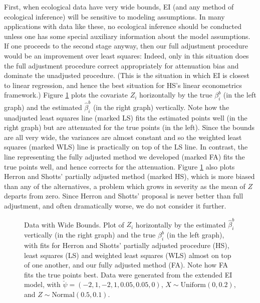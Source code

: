 \documentclass[11pt,titlepage]{article}
\begin{document}
First, when ecological data have very wide bounds, EI (and any method
of ecological inference) will be sensitive to modeling assumptions.
In many applications with data like these, no ecological inference
should be conducted unless one has some special auxiliary information
about the model assumptions.  If one proceeds to the second stage
anyway, then our full adjustment procedure would be an improvement
over least squares: Indeed, only in this situation does the full
adjustment procedure correct appropriately for attenuation bias and
dominate the unadjusted procedure.  (This is the situation in which EI
is closest to linear regression, and hence the best situation for HS's
linear econometrics framework.)  Figure \ref{f:wide} plots the
covariate $Z_i$ horizontally by the true $\beta_i^b$ (in the left
graph) and the estimated $\hat\beta_i^b$ (in the right graph)
vertically.  Note how the unadjusted least squares line (marked LS)
fits the estimated points well (in the right graph) but are attenuated
for the true points (in the left).  Since the bounds are all very
wide, the variances are almost constant and so the weighted least
squares (marked WLS) line is practically on top of the LS line.  In
contrast, the line representing the fully adjusted method we developed
(marked FA) fits the true points well, and hence corrects for the
attenuation.  Figure \ref{f:wide} also plots Herron and Shotts'
partially adjusted method (marked HS), which is more biased than any
of the alternatives, a problem which grows in severity as the mean of
$Z$ departs from zero.  Since Herron and Shotts' proposal is never
better than full adjustment, and often dramatically worse, we do not
consider it further.
\begin{figure}[t]
  \begin{center}
    \caption{Data with Wide Bounds. Plot of $Z_i$ horizontally by
      the estimated $\hat\beta_i^b$ vertically (in the right graph)
      and the true $\beta_i^b$ (in the left graph), with fits for
      Herron and Shotts' partially adjusted procedure (HS), least
      squares (LS) and weighted least squares (WLS) almost on top of
      one another, and our fully adjusted method (FA).  Note how FA
      fits the true points best.  Data were generated from the
      extended EI model, with $\breve\psi=(-2,1,-2,1,0.05,0.05,0)$, $X
      \sim \textrm{Uniform}(0,0.2)$, and $Z \sim
      \textrm{Normal}(0.5,0.1)$.}
    \label{f:wide}
  \end{center}
\end{figure}
\end{document}
